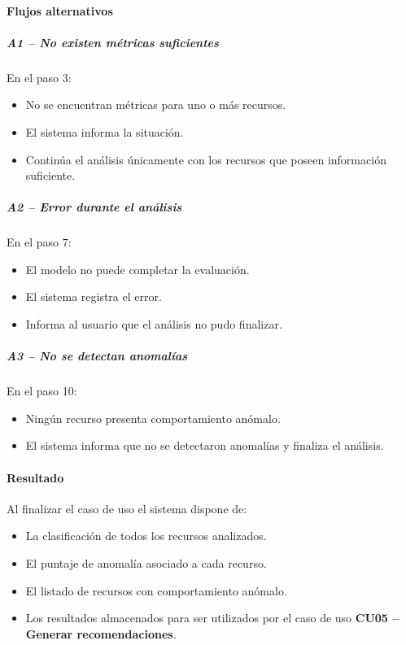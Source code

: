 \paragraph*{Flujos alternativos}

\subparagraph{A1 -- No existen métricas suficientes}

En el paso 3:

\begin{itemize}
\item No se encuentran métricas para uno o más recursos.
\item El sistema informa la situación.
\item Continúa el análisis únicamente con los recursos que poseen información suficiente.
\end{itemize}

\subparagraph{A2 -- Error durante el análisis}

En el paso 7:

\begin{itemize}
\item El modelo no puede completar la evaluación.
\item El sistema registra el error.
\item Informa al usuario que el análisis no pudo finalizar.
\end{itemize}

\subparagraph{A3 -- No se detectan anomalías}

En el paso 10:

\begin{itemize}
\item Ningún recurso presenta comportamiento anómalo.
\item El sistema informa que no se detectaron anomalías y finaliza el análisis.
\end{itemize}

\paragraph*{Resultado}

Al finalizar el caso de uso el sistema dispone de:

\begin{itemize}
\item La clasificación de todos los recursos analizados.
\item El puntaje de anomalía asociado a cada recurso.
\item El listado de recursos con comportamiento anómalo.
\item Los resultados almacenados para ser utilizados por el caso de uso \textbf{CU05 -- Generar recomendaciones}.
\end{itemize}

